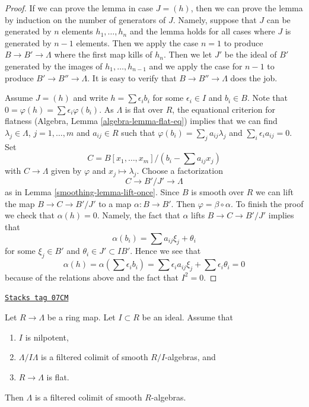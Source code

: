 \begin{proof}

If we can prove the lemma in case $J = (h)$, then we can prove the
lemma by induction on the number of generators of $J$. Namely, suppose
that $J$ can be generated by $n$ elements $h_1, \ldots, h_n$ and the
lemma holds for all cases where $J$ is generated by $n - 1$ elements.
Then we apply the case $n = 1$ to produce $B \to B' \to \Lambda$
where the first map kills of $h_n$. Then we let $J'$ be the
ideal of $B'$ generated by the images of $h_1, \ldots, h_{n - 1}$
and we apply the case for $n - 1$ to produce $B' \to B'' \to \Lambda$.
It is easy to verify that $B \to B'' \to \Lambda$ does the job.

\medskip\noindent
Assume $J = (h)$ and write $h = \sum \epsilon_i b_i$
for some $\epsilon_i \in I$ and $b_i \in B$. Note that
$0 = \varphi(h) = \sum \epsilon_i \varphi(b_i)$.
As $\Lambda$ is flat over $R$, the equational criterion for
flatness (Algebra, Lemma \ref{algebra-lemma-flat-eq})
implies that we can find $\lambda_j \in \Lambda$,
$j = 1, \ldots, m$ and $a_{ij} \in R$ such that
$\varphi(b_i) = \sum_j a_{ij} \lambda_j$ and $\sum_i \epsilon_i a_{ij} = 0$.
Set
$$
C = B[x_1, \ldots, x_m]/(b_i - \sum a_{ij} x_j)
$$
with $C \to \Lambda$ given by $\varphi$ and $x_j \mapsto \lambda_j$.
Choose a factorization
$$
C \to B'/J' \to \Lambda
$$
as in Lemma \ref{smoothing-lemma-lift-once}. Since $B$ is smooth over $R$ we can
lift the map $B \to C \to B'/J'$ to a map $\alpha : B \to B'$. Then
$\varphi = \beta \circ \alpha$. To finish the proof we check that
$\alpha(h) = 0$. Namely, the fact that $\alpha$ lifts
$B \to C \to B'/J'$ implies that
$$
\alpha(b_i) = \sum a_{ij} \xi_j + \theta_i
$$
for some $\xi_j \in B'$ and $\theta_i \in J' \subset IB'$.
Hence we see that
$$
\alpha(h) = \alpha(\sum \epsilon_i b_i) =
\sum \epsilon_i a_{ij} \xi_j + \sum \epsilon_i \theta_i = 0
$$
because of the relations above and the fact that $I^2 = 0$.
\end{proof}

\begin{proposition}
\label{smoothing-proposition-lift}
\href{https://stacks.math.columbia.edu/tag/07CM}{\texttt{Stacks tag 07CM}}


Let $R \to \Lambda$ be a ring map. Let $I \subset R$ be an ideal.
Assume that
\begin{enumerate}
\item $I$ is nilpotent,
\item $\Lambda/I\Lambda$ is a filtered colimit of smooth $R/I$-algebras, and
\item $R \to \Lambda$ is flat.
\end{enumerate}
Then $\Lambda$ is a filtered colimit of smooth $R$-algebras.
\end{proposition}

